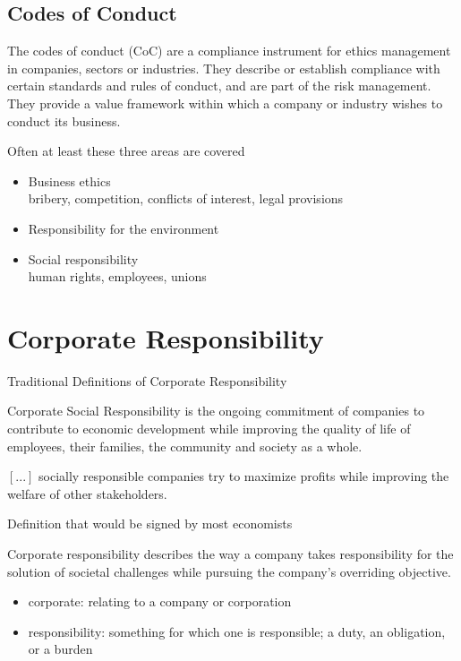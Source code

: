 \documentclass[11pt]{article}
\theoremstyle{definition}
\begin{document}
\subsection{Codes of Conduct}
The codes of conduct (CoC) are a compliance instrument for ethics management in companies, sectors or industries. They describe or establish compliance with certain standards and rules of conduct, and are part of the risk management. They provide a value framework within which a company or industry wishes to conduct its business.

Often at least these three areas are covered
\begin{itemize}
	\item Business ethics\\
	bribery, competition, conflicts of interest, legal provisions
	\item Responsibility for the environment
	\item Social responsibility\\
	human rights, employees, unions
\end{itemize}

\section{Corporate Responsibility}
Traditional Definitions of Corporate Responsibility
\begin{definition}
	Corporate Social Responsibility is the ongoing commitment of companies to contribute to economic development while improving the quality of life of employees, their families, the community and society as a whole.
\end{definition}

\begin{definition}
	$[...]$ socially responsible companies try to maximize profits while improving the welfare of other stakeholders.
\end{definition}

Definition that would be signed by most economists
\begin{definition}
	Corporate responsibility describes the way a company takes responsibility for the solution of societal challenges while pursuing the company’s overriding objective.
	\begin{itemize}
		\item corporate: relating to a company or corporation
		\item responsibility: something for which one is responsible; a duty, an obligation, or a burden
	\end{itemize}
\end{definition}
\end{document}
